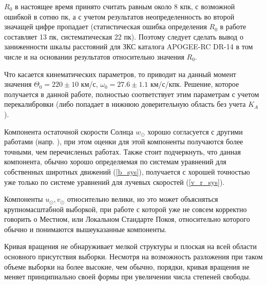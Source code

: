 \documentclass{matmex-diploma-custom}
\begin{document}
\par $R_0$ в настоящее время принято считать равным около $8$ кпк, с возможной ошибкой в сотню пк, а с учетом результатов \cite{Gravity} неопределенность во второй значащей цифре пропадает (статистическая ошибка определения $R_0$ в работе \cite{Gravity} составляет 13 пк, систематическая 22 пк). Поэтому следует сделать вывод о заниженности шкалы расстояний для ЗКС каталога APOGEE-RC DR-14 \cite{DRdata} в том числе и на основании результатов относительно значения $R_0$.
\par Что касается кинематических параметров, то \cite{CamarilloVEL} приводит на данный момент значения $\Theta_0 = 220 \pm 10$ км/с, $\omega_0 = 27.6 \pm 1.1$ км/с/кпк. Решение, которое получается в данной работе, полностью соответствует этим параметрам с учетом перекалибровки (либо попадает в нижнюю доверительную область без учета $K_A$).
\par Компонента остаточной скорости Солнца $w_{\odot}$ хорошо согласуется с другими работами (напр. \cite{Baikbob} \cite{Rastorguev}), при этом оценки для этой компоненты получаются более точными, чем перечисленых работах. Также стоит подчеркнуть, что данная компонента, обычно хорошо определяемая по системам уравнений для собственных широтных движений (\ref{b_sys}), получается с хорошей точностью уже только по системе уравнений для лучевых скоростей (\ref{v_r_sys}). 
\par Компоненты $u_{\odot}, v_{\odot}$ относительно велики, но это может объясняться крупномасштабной выборкой, при работе с которой уже не совсем корректно говорить о Местном, или Локальном Стандарте Покоя, относительно которого обычно и понимаются вышеуказанные компоненты.
\par Кривая вращения не обнаруживает мелкой структуры и плоская на всей области основного присутствия выборки. Несмотря на возможность разложения при таком объеме выборки на более высокие, чем обычно, порядки, кривая вращения не меняет принципиально своей формы при увеличении числа степеней свободы.
\pagebreak
\end{document}
